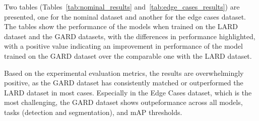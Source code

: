 Two tables (Tables~\ref{tab:nominal_results} and~\ref{tab:edge_cases_results}) are presented, one for the nominal dataset and another for the edge
cases dataset. The tables show the performance of the models when trained on the
LARD dataset and the GARD datasets, with the differences in performance
highlighted, with a positive value indicating an improvement in performance of
the model trained on the GARD dataset over the comparable one with the LARD dataset.

Based on the experimental evaluation metrics, the results are overwhelmingly
positive, as the GARD dataset has consistently 
matched or outperformed the LARD dataset in most cases. Especially in the
Edge Cases dataset, which is the most challenging, the GARD dataset shows
outpeformance across all models, tasks (detection and segmentation), and mAP
thresholds.

\medskip

